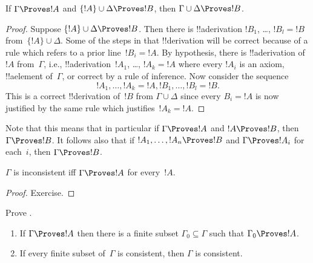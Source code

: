 \begin{prop}[Transitivity]
If $\Gamma \Proves !A$ and $\{!A\} \cup \Delta \Proves
!B$, then $\Gamma \cup \Delta \Proves !B$.
\end{prop}

\begin{proof}
  Suppose $\{!A\} \cup \Delta \Proves !B$. Then there is
  !!a{derivation} $!B_1$, \dots, $!B_l = !B$ from~$\{!A\} \cup
  \Delta$. Some of the steps in that !!{derivation} will be correct
  because of a rule which refers to a prior line~$!B_i = !A$. By
  hypothesis, there is !!a{derivation} of~$!A$ from~$\Gamma$, i.e.,
  !!a{derivation}~$!A_1$, \dots, $!A_k = !A$ where every $!A_i$ is an
  axiom, !!a{element} of~$\Gamma$, or correct by a rule of
  inference. Now consider the sequence
  \[
  !A_1, \dots, !A_k = !A, !B_1, \dots, !B_l = !B.
  \]
  This is a correct !!{derivation} of~$!B$ from $\Gamma \cup \Delta$
  since every $B_i = !A$ is now justified by the same rule which
  justifies~$!A_k = !A$.
\end{proof}

Note that this means that in particular if $\Gamma \Proves !A$ and $!A
\Proves !B$, then $\Gamma \Proves !B$. It follows also that if $!A_1,
\dots, !A_n \Proves !B$ and $\Gamma \Proves !A_i$ for each~$i$, then
$\Gamma \Proves !B$.

\begin{prop}
$\Gamma$ is inconsistent iff $\Gamma \Proves !A$ for every~$!A$.
\end{prop}

\begin{proof}
Exercise.
\end{proof}




\begin{prob}
Prove .
\end{prob}


\begin{prop}[Compactness]
  \begin{enumerate}
  \item If $\Gamma \Proves !A$ then there is a finite subset $\Gamma_0
    \subseteq \Gamma$ such that $\Gamma_0 \Proves !A$.
  \item If every finite subset of~$\Gamma$ is
    consistent, then $\Gamma$ is consistent.
  \end{enumerate}
\end{prop}

